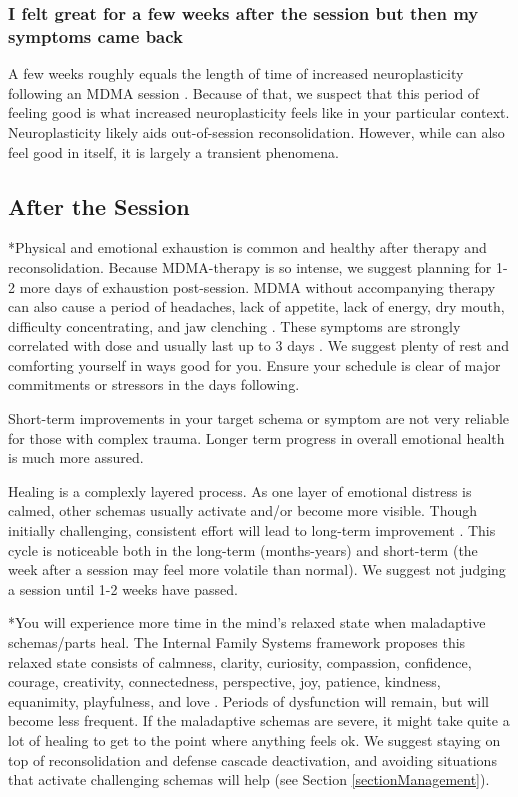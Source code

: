 \documentclass[12pt,letterpaper]{article}
\begin{document}
\subsubsection{I felt great for a few weeks after the session but then my symptoms came back}
A few weeks roughly equals the length of time of increased neuroplasticity following an MDMA session \cite{nardouMDMAPlasticity}. Because of that, we suspect that this period of feeling good is what increased neuroplasticity feels like in your particular context. Neuroplasticity likely aids out-of-session reconsolidation. However, while can also feel good in itself, it is largely a transient phenomena.
\subsection{After the Session}
\label{after}
*Physical and emotional exhaustion is common and healthy after therapy and reconsolidation. Because MDMA-therapy is so intense, we suggest planning for 1-2 more days of exhaustion post-session. MDMA without accompanying therapy can also cause a period of headaches, lack of appetite, lack of energy, dry mouth, difficulty concentrating, and jaw clenching \cite{vizeliActuteEffects}. These symptoms are strongly correlated with dose and usually last up to 3 days \cite{liechtiGender}. We suggest plenty of rest and comforting yourself in ways good for you. Ensure your schedule is clear of major commitments or stressors in the days following. 

Short-term improvements in your target schema or symptom are not very reliable for those with complex trauma. Longer term progress in overall emotional health is much more assured.

Healing is a complexly layered process. As one layer of emotional distress is calmed, other schemas usually activate and/or become more visible. Though initially challenging, consistent effort will lead to long-term improvement \cite{vanderKolkBody}. This cycle is noticeable both in the long-term (months-years) and short-term (the week after a session may feel more volatile than normal). We suggest not judging a session until 1-2 weeks have passed.

*You will experience more time in the mind's relaxed state when maladaptive schemas/parts heal. The Internal Family Systems framework proposes this relaxed state consists of calmness, clarity, curiosity, compassion, confidence, courage, creativity, connectedness, perspective, joy, patience, kindness, equanimity, playfulness, and love \cite{schwartzIFS}. Periods of dysfunction will remain, but will become less frequent. If the maladaptive schemas are severe, it might take quite a lot of healing to get to the point where anything feels ok. We suggest staying on top of reconsolidation and defense cascade deactivation, and avoiding situations that activate challenging schemas will help (see Section \ref{sectionManagement}).
\end{document}
